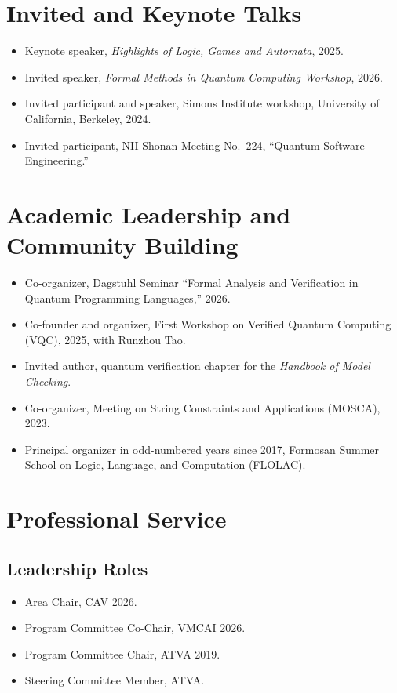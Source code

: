 \documentclass[11pt,a4paper]{article}
\begin{document}
\section{Invited and Keynote Talks}

\begin{itemize}
  \item Keynote speaker, \emph{Highlights of Logic, Games and Automata}, 2025.
  \item Invited speaker, \emph{Formal Methods in Quantum Computing Workshop}, 2026.
  \item Invited participant and speaker, Simons Institute workshop, University of California, Berkeley, 2024.
  \item Invited participant, NII Shonan Meeting No.\ 224, ``Quantum Software Engineering.''
\end{itemize}

\section{Academic Leadership and Community Building}

\begin{itemize}
  \item Co-organizer, Dagstuhl Seminar ``Formal Analysis and Verification in Quantum Programming Languages,'' 2026.
  \item Co-founder and organizer, First Workshop on Verified Quantum Computing (VQC), 2025, with Runzhou Tao.
  \item Invited author, quantum verification chapter for the \emph{Handbook of Model Checking}.
  \item Co-organizer, Meeting on String Constraints and Applications (MOSCA), 2023.
  \item Principal organizer in odd-numbered years since 2017, Formosan Summer School on Logic, Language, and Computation (FLOLAC).
\end{itemize}

\section{Professional Service}

\subsection*{Leadership Roles}
\begin{itemize}
  \item Area Chair, CAV 2026.
  \item Program Committee Co-Chair, VMCAI 2026.
  \item Program Committee Chair, ATVA 2019.
  \item Steering Committee Member, ATVA.
\end{itemize}
\end{document}
